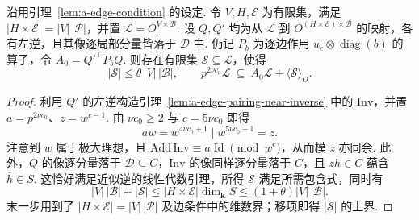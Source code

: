 \begin{lemma}[边配对的额外生成元界]
\label{lem:a-edge-few-generators}
\emitthmsource
沿用引理~\ref{lem:a-edge-condition} 的设定. 令 $V,H,\mathcal E$ 为有限集，满足 $|H\times\mathcal E|=|V|\,|\mathcal P|$，并置 $\mathcal L=O^{V\times\mathcal B}$. 设 $Q,Q'$ 均为从 $\mathcal L$ 到 $O^{(H\times\mathcal E)\times\mathcal B}$ 的映射，各有左逆，且其像逐局部分量皆落于 $\mathcal D$ 中. 仍记 $P_b$ 为逐边作用 $u_e\otimes\operatorname{diag}(b)$ 的算子，令 $A_0=Q'^\top P_bQ$. 则存在有限集 $\mathcal S\subseteq\mathcal L$，使得
\[
 |\mathcal S|\le\theta\,|V|\,|\mathcal B|,\qquad
 p^{2\nu c_0}\mathcal L\ \subseteq\ A_0\mathcal L+\langle\mathcal S\rangle_O .
\]
\end{lemma}
\begin{proof}
利用 $Q'$ 的左逆构造引理~\ref{lem:a-edge-pairing-near-inverse} 中的 $\mathrm{Inv}$，并置 $a=p^{2\nu c_0}$、$z=w^{c-1}$. 由 $\nu c_0\ge2$ 与 $c=5\nu c_0$ 即得
\[
 aw=w^{4\nu c_0+1}\mid w^{5\nu c_0-1}=z .
\]
注意到 $w$ 属于极大理想，且 $\mathrm{Add}\,\mathrm{Inv}\equiv a\operatorname{Id}\pmod{w^c}$，从而模 $z$ 亦同余. 此外，$Q$ 的像逐分量落于 $\mathcal D\subseteq C$，$\mathrm{Inv}$ 的像同样逐分量落于 $C$，且 $zh\in C$ 蕴含 $\overline h\in S$. 这恰好满足近似逆的线性代数引理，所得 $\mathcal S$ 满足所需包含式，同时有
\[
 |V|\,|\mathcal B|+|\mathcal S|
   \le |H\times\mathcal E|\dim_\mathbf k S
   \le (1+\theta)|V|\,|\mathcal B|.
\]
末一步用到了 $|H\times\mathcal E|=|V|\,|\mathcal P|$ 及边条件中的维数界；移项即得 $|\mathcal S|$ 的上界.
\end{proof}

